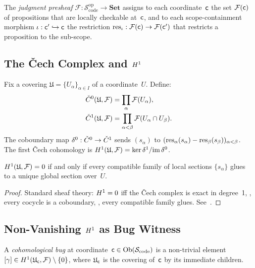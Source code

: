 \documentclass[11pt]{article}
\newcommand{\SemSite}{\mathcal{S}_{\mathrm{code}}}%
\begin{document}
\begin{definition}\label{def:presheaf}
The \emph{judgment presheaf} $\mathcal{F} : \SemSite^{\mathrm{op}} \to
\mathbf{Set}$ assigns to each coordinate~$\mathsf{c}$ the set
$\mathcal{F}(\mathsf{c})$ of propositions that are locally checkable at~$\mathsf{c}$,
and to each scope-containment morphism
$\iota : \mathsf{c}' \hookrightarrow \mathsf{c}$ the restriction
$\mathrm{res}_{\iota} : \mathcal{F}(\mathsf{c}) \to \mathcal{F}(\mathsf{c}')$
that restricts a proposition to the sub-scope.
\end{definition}

\subsection{The \v{C}ech Complex and $H^{1}$}

Fix a covering $\mathfrak{U} = \{U_\alpha\}_{\alpha \in I}$ of a
coordinate~$U$.  Define:
\begin{align*}
  \check{C}^0(\mathfrak{U},\mathcal{F})
    &= \prod_\alpha \mathcal{F}(U_\alpha),\\
  \check{C}^1(\mathfrak{U},\mathcal{F})
    &= \prod_{\alpha < \beta} \mathcal{F}(U_\alpha \cap U_\beta).
\end{align*}
The coboundary map
$\delta^0 : \check{C}^0 \to \check{C}^1$ sends $(s_\alpha)$ to
$(\mathrm{res}_\alpha(s_\alpha) - \mathrm{res}_\beta(s_\beta))_{\alpha<\beta}$.
The first \v{C}ech cohomology is
$H^{1}(\mathfrak{U},\mathcal{F}) = \ker\delta^1 / \mathrm{im}\,\delta^0$.

\begin{proposition}\label{prop:zero-iff-glue}
$H^{1}(\mathfrak{U},\mathcal{F}) = 0$ if and only if every compatible
family of local sections $\{s_\alpha\}$ glues to a unique global section
over~$U$.
\end{proposition}

\begin{proof}
Standard sheaf theory: $H^{1} = 0$ iff the \v{C}ech complex is
exact in degree~1, \ie, every cocycle is a coboundary, \ie, every
compatible family glues.  See~\cite{Serre1955}.
\end{proof}

\subsection{Non-Vanishing $H^{1}$ as Bug Witness}

\begin{definition}\label{def:coh-bug}
A \emph{cohomological bug} at coordinate~$\coord \in \Ob(\SemSite)$ is a
non-trivial element
$[\gamma] \in H^{1}(\mathfrak{U}_{\mathsf{c}}, \mathcal{F}) \setminus \{0\}$,
where $\mathfrak{U}_{\mathsf{c}}$ is the covering of~$\mathsf{c}$ by its immediate
children.
\end{definition}
\end{document}
